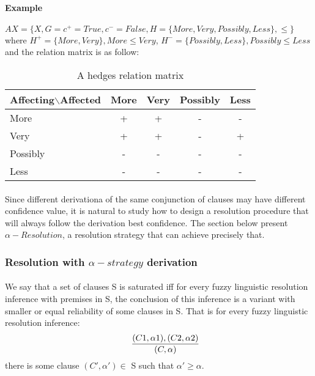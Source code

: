 \documentclass[part1.tex]{subfiles}
\begin{document}
\paragraph{Example}
$AX = \{X, G = {c^{+} = True, c^{-} =
False}, H = \{More, Very, Possibly, Less\}, \le\}$ \\ where
$H^{+} =
\{More, Very\}, More \le Very$, $H^{-} = \{Possibly, Less\},
Possibly \le Less$ and the relation matrix is as follow:
\begin{table}[H]
    \centering
    \begin{tabular}{|l|c|c|c|c|}
      \hline
                  Affecting$\backslash$Affected & More & Very &
      Possibly & Less \\ \hline
                  More                        & +    & +    & -
      & -    \\ \hline
                  Very                        & +    & +    & -
      & +    \\ \hline
                  Possibly                    & -    & -    & -
      & -    \\ \hline
                  Less                        & -    & -    & -
      & -    \\ \hline
    \end{tabular}
    \caption {A hedges relation matrix}
  \end{table}

\paragraph{} Since different derivationa of the same conjunction of clauses may have different
confidence value, it is natural to study how to design a resolution 
procedure that will always follow the derivation best confidence. The section below present
$\alpha-Resolution$, a resolution strategy that can achieve
precisely that.
\subsubsection{Resolution with $\alpha-strategy$ derivation}
\paragraph{} 
We say that a set of clauses S is saturated iff for every fuzzy
linguistic resolution inference with premises in S, the
conclusion of this inference is a variant with smaller or equal
reliability of some clauses in S. That is for every fuzzy
linguistic resolution inference:\\
\[\indent \frac{(C1, \alpha1), (C2, \alpha2)}{(C,\alpha)}
\]
\indent there is some clause \((C',\alpha') \in \) S such that \(\alpha' \ge \alpha\).
\end{document}
